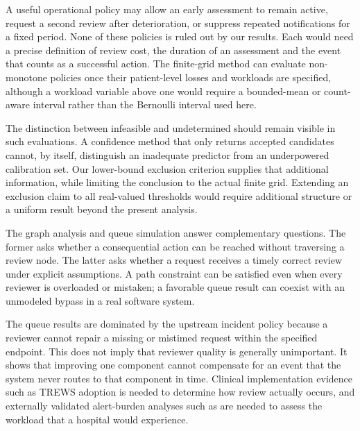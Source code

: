 A useful operational policy may allow an early assessment to remain active, request a second review after deterioration, or suppress repeated notifications for a fixed period. None of these policies is ruled out by our results. Each would need a precise definition of review cost, the duration of an assessment and the event that counts as a successful action. The finite-grid method can evaluate non-monotone policies once their patient-level losses and workloads are specified, although a workload variable above one would require a bounded-mean or count-aware interval rather than the Bernoulli interval used here.

The distinction between infeasible and undetermined should remain visible in such evaluations. A confidence method that only returns accepted candidates cannot, by itself, distinguish an inadequate predictor from an underpowered calibration set. Our lower-bound exclusion criterion supplies that additional information, while limiting the conclusion to the actual finite grid. Extending an exclusion claim to all real-valued thresholds would require additional structure or a uniform result beyond the present analysis.

The graph analysis and queue simulation answer complementary questions. The former asks whether a consequential action can be reached without traversing a review node. The latter asks whether a request receives a timely correct review under explicit assumptions. A path constraint can be satisfied even when every reviewer is overloaded or mistaken; a favorable queue result can coexist with an unmodeled bypass in a real software system.

The queue results are dominated by the upstream incident policy because a reviewer cannot repair a missing or mistimed request within the specified endpoint. This does not imply that reviewer quality is generally unimportant. It shows that improving one component cannot compensate for an event that the system never routes to that component in time. Clinical implementation evidence such as TREWS adoption \citep{trews} is needed to determine how review actually occurs, and externally validated alert-burden analyses such as \citet{wong2021} are needed to assess the workload that a hospital would experience.
